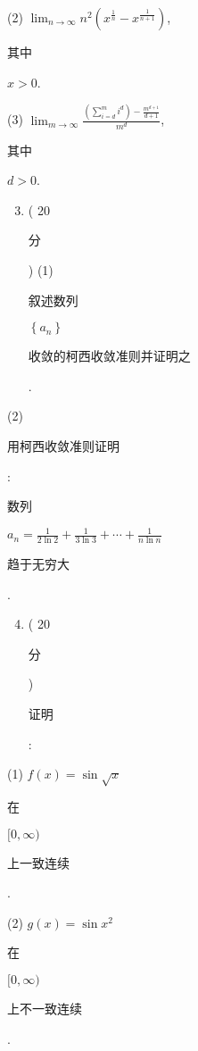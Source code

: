 \documentclass[10pt]{article}
\begin{document}
(2) $\lim _{n \rightarrow \infty} n^{2}\left(x^{\frac{1}{n}}-x^{\frac{1}{n+1}}\right)$, \begin{CJK}{UTF8}{mj}其中\end{CJK} $x>0$.

(3) $\lim _{m \rightarrow \infty} \frac{\left(\sum_{i=d}^{m} i^{d}\right)-\frac{m^{d+1}}{d+1}}{m^{d}}$, \begin{CJK}{UTF8}{mj}其中\end{CJK} $d>0$.

\begin{enumerate}
  \setcounter{enumi}{2}
  \item ( 20 \begin{CJK}{UTF8}{mj}分\end{CJK}) (1) \begin{CJK}{UTF8}{mj}叙述数列\end{CJK} $\left\{a_{n}\right\}$ \begin{CJK}{UTF8}{mj}收敛的柯西收敛准则并证明之\end{CJK}.
\end{enumerate}
(2) \begin{CJK}{UTF8}{mj}用柯西收敛准则证明\end{CJK}: \begin{CJK}{UTF8}{mj}数列\end{CJK} $a_{n}=\frac{1}{2 \ln 2}+\frac{1}{3 \ln 3}+\cdots+\frac{1}{n \ln n}$ \begin{CJK}{UTF8}{mj}趋于无穷大\end{CJK}.

\begin{enumerate}
  \setcounter{enumi}{3}
  \item ( 20 \begin{CJK}{UTF8}{mj}分\end{CJK}) \begin{CJK}{UTF8}{mj}证明\end{CJK}:
\end{enumerate}
(1) $f(x)=\sin \sqrt{x}$ \begin{CJK}{UTF8}{mj}在\end{CJK} $[0, \infty)$ \begin{CJK}{UTF8}{mj}上一致连续\end{CJK}.

(2) $g(x)=\sin x^{2}$ \begin{CJK}{UTF8}{mj}在\end{CJK} $[0, \infty)$ \begin{CJK}{UTF8}{mj}上不一致连续\end{CJK}.
\end{document}
